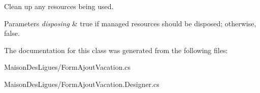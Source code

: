 Clean up any resources being used. 


\begin{DoxyParams}{Parameters}
{\em disposing} & true if managed resources should be disposed; otherwise, false.\\
\hline
\end{DoxyParams}


The documentation for this class was generated from the following files\+:\begin{DoxyCompactItemize}
\item 
Maison\+Des\+Ligues/Form\+Ajout\+Vacation.\+cs\item 
Maison\+Des\+Ligues/Form\+Ajout\+Vacation.\+Designer.\+cs\end{DoxyCompactItemize}
